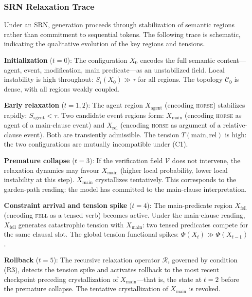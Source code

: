 \documentclass[11pt, a4paper]{article}
\theoremstyle{srn}
\theoremstyle{srnremark}
\newcommand{\Cstruct}{\mathcal{C}}           %
\newcommand{\Rop}{\mathcal{R}}           %
\newcommand{\Phiten}{\varPhi}            %
\begin{document}
\subsubsection*{SRN Relaxation Trace}

Under an SRN, generation proceeds through stabilization of semantic
regions rather than commitment to sequential tokens.
The following trace is schematic, indicating the qualitative evolution
of the key regions and tensions.

\medskip
\noindent
\textbf{Initialization} ($t = 0$):
The configuration $X_0$ encodes the full semantic content---agent,
event, modification, main predicate---as an unstabilized field.
Local instability is high throughout: $S_i(X_0) \gg \tau$ for all
regions. The topology $\Cstruct_0$ is dense, with all regions weakly
coupled.

\medskip
\noindent
\textbf{Early relaxation} ($t = 1, 2$):
The agent region $X_{\mathrm{agent}}$ (encoding
\textsc{horse}) stabilizes rapidly: $S_{\mathrm{agent}} < \tau$.
Two candidate event regions form: $X_{\mathrm{main}}$ (encoding
\textsc{horse} as agent of a main-clause event) and $X_{\mathrm{rel}}$
(encoding \textsc{horse} as argument of a relative-clause event).
Both are transiently admissible.
The tension $T(\mathrm{main}, \mathrm{rel})$ is high: the two
configurations are mutually incompatible under (C1).

\medskip
\noindent
\textbf{Premature collapse} ($t = 3$):
If the verification field $\mathcal{V}$ does not intervene, the
relaxation dynamics may favour $X_{\mathrm{main}}$ (higher local
probability, lower local instability at this step).
$X_{\mathrm{main}}$ crystallizes tentatively.
This corresponds to the garden-path reading: the model has committed
to the main-clause interpretation.

\medskip
\noindent
\textbf{Constraint arrival and tension spike} ($t = 4$):
The main-predicate region $X_{\mathrm{fell}}$ (encoding
\textsc{fell} as a tensed verb) becomes active.
Under the main-clause reading, $X_{\mathrm{fell}}$ generates
catastrophic tension with $X_{\mathrm{main}}$: two tensed predicates
compete for the same clausal slot.
The global tension functional spikes:
$\Phiten(X_t) \gg \Phiten(X_{t-1})$.

\medskip
\noindent
\textbf{Rollback} ($t = 5$):
The recursive relaxation operator $\Rop$, governed by condition (R3),
detects the tension spike and activates rollback to the most recent
checkpoint preceding crystallization of $X_{\mathrm{main}}$---that
is, the state at $t = 2$ before the premature collapse.
The tentative crystallization of $X_{\mathrm{main}}$ is revoked.
\end{document}
